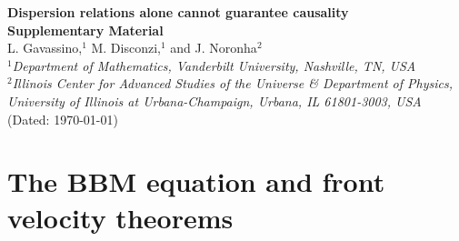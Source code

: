 \documentclass[prl, amsfonts, amssymb, amsmath, nofootinbib,reprint, showkeys, twoside,notitlepage]{revtex4-2}
\theoremstyle{definition}
\theoremstyle{theorem}
\theoremstyle{corollary}
\begin{document}




\newpage


\onecolumngrid
\newpage
\begin{center}
  \textbf{\large Dispersion relations alone cannot guarantee causality\\Supplementary Material}\\[.2cm]
  L. Gavassino,$^{1}$ M. Disconzi,$^{1}$ and J. Noronha$^2$\\[.1cm]
  {\itshape ${}^1$Department of Mathematics, Vanderbilt University, Nashville, TN, USA\\
  ${}^2$Illinois Center for Advanced Studies of the Universe \& Department of Physics,\\University of Illinois at Urbana-Champaign, Urbana, IL 61801-3003, USA\\}
(Dated: \today)\\[1cm]
\end{center}

\setcounter{equation}{0}
\setcounter{figure}{0}
\setcounter{table}{0}
\setcounter{page}{1}
\renewcommand{\theequation}{S\arabic{equation}}
\renewcommand{\thefigure}{S\arabic{figure}}


\section{The BBM equation and front velocity theorems}
\end{document}
